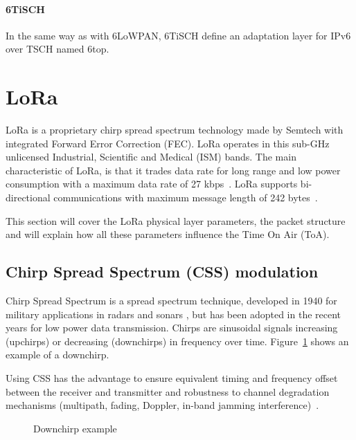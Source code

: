 \paragraph{6TiSCH}

In the same way as with 6LoWPAN, 6TiSCH define an adaptation layer for IPv6
over TSCH named 6top.

\section{LoRa\label{section:lora}}

LoRa is a proprietary chirp spread spectrum technology made by Semtech with
integrated Forward Error Correction (FEC).
LoRa operates in this sub-GHz unlicensed Industrial, Scientific and Medical
(ISM) bands.
The main characteristic of LoRa, is that it trades data rate for long range 
and low power consumption with a maximum data rate of 27 kbps~\cite{8030482}.
LoRa supports bi-directional communications with maximum message length of 242
bytes~\cite{loraalliance:lorawanspecification}.

This section will cover the LoRa physical layer parameters, the packet structure and 
will explain how all these parameters influence the Time On Air (ToA).

\subsection{Chirp Spread Spectrum (CSS) modulation}

Chirp Spread Spectrum is a spread spectrum technique, developed in 1940 for
military applications in radars and sonars \cite{semtech:modulationbasics}, but
has been adopted in the recent years for low power data transmission.
Chirps are sinusoidal signals increasing (upchirps) or decreasing (downchirps)
in frequency over time.
Figure~\ref{fig:downchirp} shows an example of a downchirp.

Using CSS has the advantage to ensure equivalent timing and frequency offset
between the receiver and transmitter and robustness to channel degradation
mechanisms (multipath, fading, Doppler, in-band jamming
interference)~\cite{semtech:modulationbasics}.


\begin{figure}[H]
\centering
{} 
\caption{Downchirp example\label{fig:downchirp}}
\end{figure}

